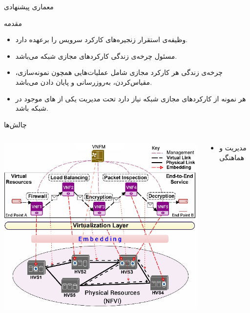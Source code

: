 \documentclass{beamer}
\makeatletter
\newcommand{\RTList}{\raggedleft\rightskip\@totalleftmargin}
\makeatother
\begin{document}
\begin{persian}
\begin{frame}{معماری پیشنهادی}
\end{frame}
\begin{frame}{مقدمه}
    \begin{itemize}\RTList{}
        \item {} وظیفه‌ی استقرار زنجیره‌های کارکرد سرویس را برعهده دارد.
        \item {} مسئول چرخه‌ی زندگی کارکردهای مجازی شبکه می‌باشد.
        \item چرخه‌ی زندگی هر کارکرد مجازی شامل عملیات‌هایی همچون نمونه‌سازی، مقیاس‌کردن، به‌روزرسانی و پایان دادن می‌باشد.
        \item هر نمونه از کارکردهای مجازی شبکه نیاز دارد تحت مدیریت یکی از های موجود در شبکه باشد.
    \end{itemize}
\end{frame}
\begin{frame}{چالش‌ها}
    \begin{columns}
        \begin{column}{0.6\textwidth}
            \includegraphics[scale=0.35]{images/embedding.png}
        \end{column}
        \begin{column}{0.4\textwidth}
            \begin{itemize}\RTList{}
                \item مدیریت و هماهنگی

\end{itemize}
\end{column}
\end{columns}
\end{frame}
\end{persian}
\end{document}
